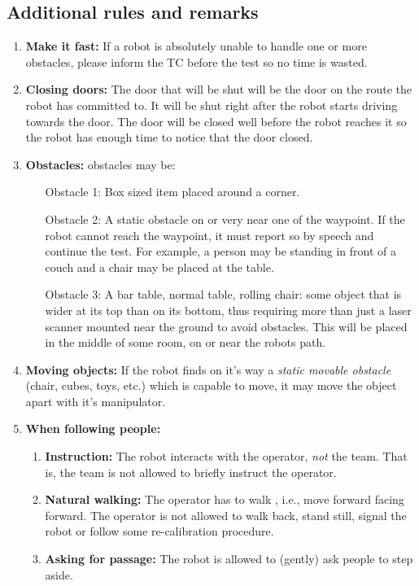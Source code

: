 \subsection{Additional rules and remarks}
\begin{enumerate}
	\item \textbf{Make it fast:} If a robot is absolutely unable to handle one or more obstacles, please inform the TC before the test so no time is wasted.
	\item \textbf{Closing doors:}  The door that will be shut will be the door on the route the robot has committed to. It will be shut right after the robot starts driving towards the door. The door will be closed well before the robot reaches it so the robot has enough time to notice that the door closed.
	\item \textbf{Obstacles:} obstacles may be:
	\begin{enumerate}
		\item [Obstacle 1:] Box sized item placed around a corner. 
		\item [Obstacle 2:] A static obstacle on or very near one of the waypoint. If the robot cannot reach the waypoint, it must report so by speech and continue the test. For example, a person may be standing in front of a couch and a chair may be placed at the table. 
		\item [Obstacle 3:] A bar table, normal table, rolling chair: some object that is wider at its top than on its bottom, thus requiring more than just a laser scanner mounted near the ground to avoid obstacles. This will be placed in the middle of some room, on or near the robots path.
	\end{enumerate}
	\item \textbf{Moving objects:} If the robot finds on it's way a \textit{static movable obstacle} (chair, cubes, toys, etc.) which is capable to move, it may move the object apart with it's manipulator.
	\item \textbf{When following people:} 
	\begin{enumerate}
		\item \textbf{Instruction:} The robot interacts with the operator, \emph{not} the team. That is, the team is not allowed to briefly instruct the operator.
		\item \textbf{Natural walking:} The operator has to walk , i.e., move forward facing forward. The operator is not allowed to walk back, stand still, signal the robot or follow some re-calibration procedure.
		\item \textbf{Asking for passage:} The robot is allowed to (gently) ask people to step aside.
	\end{enumerate}
\end{enumerate}

